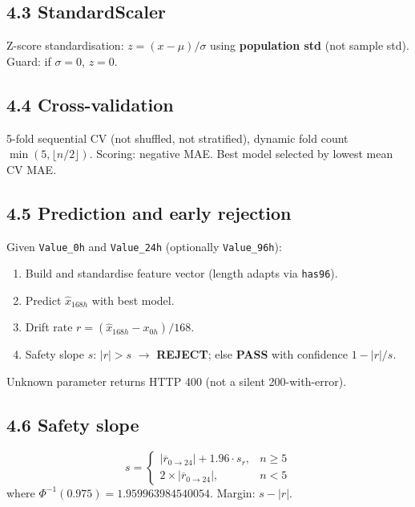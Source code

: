 \documentclass[11pt,a4paper]{article}
\newcommand{\code}[1]{\texttt{\small #1}}
\newcommand{\keys}[1]{\textbf{\sffamily#1}}
\begin{document}
\subsection*{4.3 StandardScaler}
Z-score standardisation: $z = (x - \mu)/\sigma$ using \textbf{population std} (not sample std).
Guard: if $\sigma=0$, $z=0$.

\subsection*{4.4 Cross-validation}
5-fold sequential CV (not shuffled, not stratified), dynamic fold count
$\min(5, \lfloor n/2 \rfloor)$. Scoring: negative MAE. Best model selected by lowest mean
CV MAE.

\subsection*{4.5 Prediction and early rejection}
Given \code{Value\_0h} and \code{Value\_24h} (optionally \code{Value\_96h}):
\begin{enumerate}[leftmargin=1.5em]
  \item Build and standardise feature vector (length adapts via \code{has96}).
  \item Predict $\hat{x}_{168h}$ with best model.
  \item Drift rate $r=(\hat{x}_{168h}-x_{0h})/168$.
  \item Safety slope $s$: $|r|>s$ $\rightarrow$ \keys{REJECT}; else \keys{PASS} with confidence
        $1-|r|/s$.
\end{enumerate}
Unknown parameter returns HTTP 400 (not a silent 200-with-error).

\subsection*{4.6 Safety slope}
\begin{equation*}
s =
\begin{cases}
|\overline{r}_{0\rightarrow24}|+1.96\cdot s_r, & n\ge 5\\
2\times|\overline{r}_{0\rightarrow24}|, & n<5
\end{cases}
\end{equation*}
where $\Phi^{-1}(0.975)=1.959963984540054$. Margin: $s - |r|$.
\end{document}
